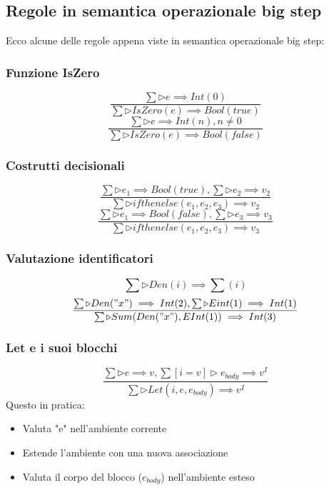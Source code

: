 \documentclass[12pt,a4paper]{article}
\begin{document}
\subsection{Regole in semantica operazionale big step}
Ecco alcune delle regole appena viste in semantica operazionale big step:\\
\subsubsection{Funzione IsZero}\[
\frac{\sum \triangleright e \implies Int(0)}{\sum \triangleright IsZero(e) \implies Bool(true)}
\]
\[
\frac{\sum \triangleright e \implies Int(n), n \ne 0}{\sum \triangleright IsZero(e) \implies Bool(false)}
\]
\subsubsection{Costrutti decisionali}
\[
\frac{\sum \triangleright e_1 \implies Bool(true), \sum \triangleright e_2 \implies v_2}{\sum \triangleright ifthenelse(e_1,e_2,e_3) \implies v_2}
\]
\[
\frac{\sum \triangleright e_1 \implies Bool(false), \sum \triangleright e_3 \implies v_3}{\sum \triangleright ifthenelse(e_1,e_2,e_3) \implies v_3}
\]
\subsubsection{Valutazione identificatori}
\[
\sum \triangleright Den(i) \implies \sum(i)
\]
\[
\frac{\sum \triangleright Den("x") \implies Int(2), \sum \triangleright Eint(1) \implies Int(1)}{\sum \triangleright Sum(Den("x"), EInt(1)) \implies Int(3)}
\]
\subsubsection{Let e i suoi blocchi}
\[
\frac{\sum \triangleright e \implies v, \sum[i=v] \triangleright e_{body} \implies v^I}{\sum \triangleright Let(i,e,e_{body}) \implies v^I}
\]
Questo in pratica:
\begin{itemize}
  \item Valuta "e" nell'ambiente corrente
  \item Estende l'ambiente con una nuova associazione
  \item Valuta il corpo del blocco ($e_{body}$) nell'ambiente esteso 
\end{itemize}
\end{document}
